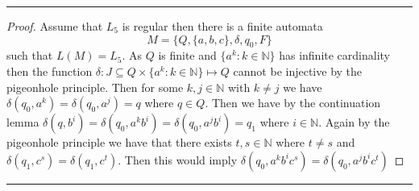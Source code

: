 \documentclass[11pt,twoside]{article}
\newcounter{problem}
\newcommand{\solution}{\bigskip\hrule\bigskip}
\newcommand{\problembreak}{\bigskip\hrule\bigskip}
\begin{document}
\solution

\begin{proof}
    Assume that $L_5$ is regular then there is a finite automata 
    \[M=\{Q,\{a,b,c\},\delta, q_0,F\}
    \]
    such that $L(M)=L_5$.
    As $Q$ is finite and $\{a^k:k\in \mathbb{N}\}$ has infinite cardinality then the function $\delta:J\subseteq Q\times \{a^k:k\in \mathbb{N}\}\mapsto Q$ cannot be injective by the pigeonhole principle. Then for some $k,j\in \mathbb{N}$ with $k\not = j$ we have $\delta(q_0,a^k)=\delta(q_0,a^j)=q$ where $q\in Q$. Then we have by the continuation lemma $\delta(q,b^i)=\delta(q_0,a^kb^i)=\delta(q_0,a^jb^i)=q_1$ where $i\in \mathbb{N}$. Again by the pigeonhole principle we have that there exists $t,s\in \mathbb{N}$ where $t\not = s$ and $\delta(q_1,c^s)=\delta(q_1,c^t)$. Then this would imply $\delta(q_0,a^kb^ic^s)=\delta(q_0,a^jb^ic^t)$
\end{proof}


\problembreak
\end{document}
